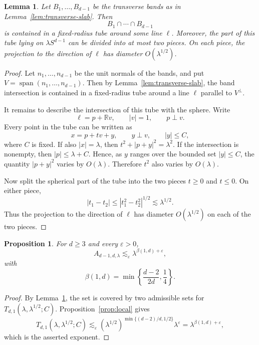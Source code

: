 \documentclass[11pt,reqno]{amsart}
\newtheorem{lemma}[theorem]{Lemma}
\newtheorem{proposition}[theorem]{Proposition}
\numberwithin{equation}{section}
\newcommand{\1}{\textbf{1}}
\newcommand{\ls}{\lesssim}
\newcommand{\R}{\mathbb R}
\newcommand{\eps}{\varepsilon}
\newcommand{\la}{\lambda}
\DeclareMathOperator{\spanop}{span}
\begin{document}
	\begin{lemma}\label{lem:end-tube}
		Let \(B_1,\ldots,B_{d-1}\) be the transverse bands as in
		Lemma~\ref{lem:transverse-slab}.  Then
		\[
		B_1\cap\cdots\cap B_{d-1}
		\]
		is contained in a fixed-radius tube around some line \(\ell\). Moreover, the part of this tube lying on \(\la S^{d-1}\) can be divided into at
		most two pieces.  On each piece, the projection to the direction of \(\ell\) has
		diameter \(O(\la^{1/2})\).
	\end{lemma}
	
	\begin{proof}
		Let \(n_1,\ldots,n_{d-1}\) be the unit normals of the bands, and put
		\( V=\spanop(n_1,\ldots,n_{d-1}) \).
		Then by Lemma~\ref{lem:transverse-slab}, the band intersection is contained in a fixed-radius tube around a line \(\ell\) parallel to \(V^\perp\).  
		
		It remains to describe the intersection of this tube with the sphere.  Write
		\[
		\ell=p+\R v,
		\qquad |v|=1,
		\qquad p\perp v.
		\]
		Every point in the tube can be written as
		\[
		x=p+tv+y,
		\qquad y\perp v,
		\qquad |y|\le C,
		\]
		where \(C\) is fixed.  If also \(|x|=\la\), then
		\(
		t^2+|p+y|^2=\la^2.
		\)
		If the intersection is nonempty, then \(|p|\le \la+C\).  Hence, as \(y\) ranges
		over the bounded set \(|y|\le C\), the quantity \(|p+y|^2\) varies by
		\(O(\la)\).  Therefore \(t^2\) also varies by \(O(\la)\).
		
		Now split the spherical part of the tube into the two pieces \(t\ge0\) and
		\(t\le0\).  On either piece,
		\[
		|t_1-t_2|
		\le
		|t_1^2-t_2^2|^{1/2}
		\ls \la^{1/2}.
		\]
		Thus the projection to the direction of \(\ell\) has diameter
		\(O(\la^{1/2})\) on each of the two pieces.
	\end{proof}
	
	\begin{proposition}\label{prop:endpoint-bound}
		For \(d\ge3\) and every \(\eps>0\),
		\[
		A_{d-1,d,\la}\ls_\eps\la^{\beta(1,d)+\eps},
		\]
		with 
		\begin{equation}\label{eq:endpoint-exponent}
			\beta(1,d)=\min\left\{\frac{d-2}{2d},\frac14\right\}.
		\end{equation}
	\end{proposition}
	
	\begin{proof}
		By Lemma~\ref{lem:end-tube}, the set is covered by two admissible sets for
		\(T_{d,1}(\la,\la^{1/2};C)\).  Proposition~\ref{prop:local} gives
		\[
		T_{d,1}(\la,\la^{1/2};C)
		\ls_\eps (\la^{1/2})^{\min\{(d-2)/d,1/2\}}\la^\eps
		=\la^{\beta(1,d)+\eps},
		\]
		which is the asserted exponent.
	\end{proof}
	
\end{document}
